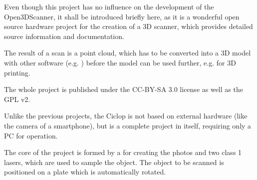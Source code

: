 %
%

Even though this project has no influence on the development of the Open3DScanner, it shall be introduced briefly here, as it is a wonderful open source hardware project for the creation of a 3D scanner, which provides detailed source information and documentation.%

The result of a scan is a point cloud, which has to be converted into a 3D model with other software (e.g. ) before the model can be used further, e.g. for 3D printing.%

The whole project is published under the CC-BY-SA 3.0 license as well as the GPL v2.%

Unlike the previous projects, the Ciclop is not based on external hardware (like the camera of a smartphone), but is a complete project in itself, requiring only a PC for operation.%

The core of the project is formed by a  for creating the photos and two class 1 lasers, which are used to sample the object. The object to be scanned is positioned on a plate which is automatically rotated.%